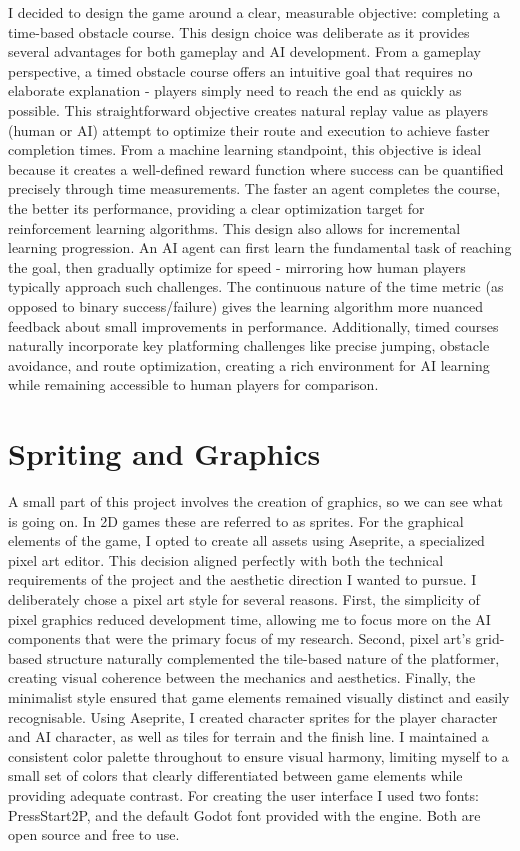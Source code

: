 I decided to design the game around a clear, measurable objective: completing a time-based obstacle course. This design choice was deliberate as it provides several advantages for both gameplay and AI development.
From a gameplay perspective, a timed obstacle course offers an intuitive goal that requires no elaborate explanation - players simply need to reach the end as quickly as possible. 
This straightforward objective creates natural replay value as players (human or AI) attempt to optimize their route and execution to achieve faster completion times.
From a machine learning standpoint, this objective is ideal because it creates a well-defined reward function where success can be quantified precisely through time measurements. 
The faster an agent completes the course, the better its performance, providing a clear optimization target for reinforcement learning algorithms.
This design also allows for incremental learning progression. An AI agent can first learn the fundamental task of reaching the goal, then gradually optimize for speed - mirroring how human players typically approach such challenges. 
The continuous nature of the time metric (as opposed to binary success/failure) gives the learning algorithm more nuanced feedback about small improvements in performance.
Additionally, timed courses naturally incorporate key platforming challenges like precise jumping, obstacle avoidance, and route optimization, creating a rich environment for AI learning while remaining accessible to human players for comparison.

\section{Spriting and Graphics}
A small part of this project involves the creation of graphics, so we can see what is going on. In 2D games these are referred to as sprites.
For the graphical elements of the game, I opted to create all assets using Aseprite, a specialized pixel art editor. This decision aligned perfectly with both the technical requirements of the project and the aesthetic direction I wanted to pursue.
I deliberately chose a pixel art style for several reasons. 
First, the simplicity of pixel graphics reduced development time, allowing me to focus more on the AI components that were the primary focus of my research. 
Second, pixel art's grid-based structure naturally complemented the tile-based nature of the platformer, creating visual coherence between the mechanics and aesthetics. 
Finally, the minimalist style ensured that game elements remained visually distinct and easily recognisable.
Using Aseprite, I created character sprites for the player character and AI character, as well as tiles for terrain and the finish line.
I maintained a consistent color palette throughout to ensure visual harmony, limiting myself to a small set of colors that clearly differentiated between game elements while providing adequate contrast.
For creating the user interface I used two fonts: PressStart2P, and the default Godot font provided with the engine. Both are open source and free to use.

